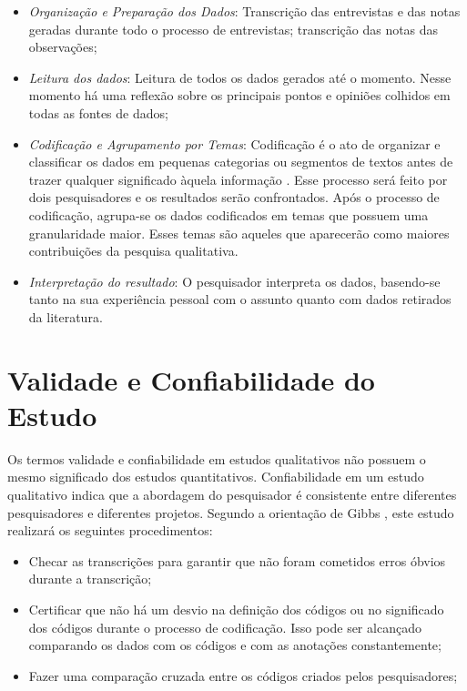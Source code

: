 \begin{itemize}

	\item \textit{Organização e Preparação dos Dados}: Transcrição das entrevistas 
	e das notas geradas durante todo o processo de entrevistas; transcrição das
	notas das observações;
	
	\item \textit{Leitura dos dados}: Leitura de todos os dados gerados até o
	momento. Nesse momento há uma reflexão sobre os principais pontos e opiniões 
	colhidos em todas as fontes de dados;
	
	\item \textit{Codificação e Agrupamento por Temas}:	Codificação é o ato de
	organizar e classificar os dados em pequenas categorias ou segmentos de textos 
	antes de trazer qualquer significado àquela informação \cite{rossman}. Esse 
	processo será feito por dois pesquisadores e os resultados serão confrontados. 
	Após o processo de codificação, agrupa-se os dados codificados em temas que 
	possuem uma granularidade maior. Esses temas são aqueles que aparecerão como 
	maiores contribuições da pesquisa qualitativa.
	
	\item \textit{Interpretação do resultado}: O pesquisador interpreta os dados, 
	basendo-se tanto na sua experiência pessoal com o assunto quanto com dados 
	retirados da literatura.

\end{itemize}
 
\section{Validade e Confiabilidade do Estudo}
\label{sec:planejamento-validacao}

Os termos validade e confiabilidade em estudos qualitativos não possuem o mesmo 
significado dos estudos quantitativos. Confiabilidade em um estudo qualitativo 
indica que a abordagem do pesquisador é consistente entre diferentes
pesquisadores e diferentes projetos. Segundo a orientação de Gibbs \cite{gibbs},
este estudo realizará os seguintes procedimentos:

\begin{itemize}
	\item Checar as transcrições para garantir que não foram cometidos erros 
	óbvios durante a transcrição;

	\item Certificar que não há um desvio na definição dos códigos ou no
	significado dos códigos durante o processo de codificação. Isso pode ser
	alcançado comparando os dados com os códigos e com as anotações constantemente;

	\item Fazer uma comparação cruzada entre os códigos criados pelos
	pesquisadores;
\end{itemize}

